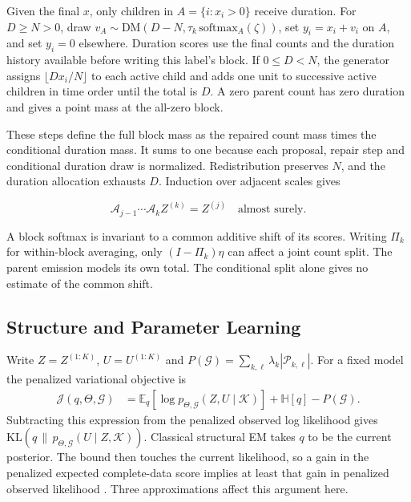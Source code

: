 \documentclass[sigconf]{acmart}
\begin{document}
Given the final \(x\), only children in \(A=\{i:x_i>0\}\) receive duration. For \(D\ge N>0\), draw \(v_A\sim\mathrm{DM}(D-N,\tau_k\,\mathrm{softmax}_A(\zeta))\), set \(y_i=x_i+v_i\) on \(A\), and set \(y_i=0\) elsewhere. Duration scores use the final counts and the duration history available before writing this label's block. If \(0\le D<N\), the generator assigns \(\lfloor D x_i/N\rfloor\) to each active child and adds one unit to successive active children in time order until the total is \(D\). A zero parent count has zero duration and gives a point mass at the all-zero block.

These steps define the full block mass as the repaired count mass times the conditional duration mass. It sums to one because each proposal, repair step and conditional duration draw is normalized. Redistribution preserves \(N\), and the duration allocation exhausts \(D\). Induction over adjacent scales gives

\begin{equation}
  \mathcal A_{j-1}\cdots\mathcal A_kZ^{(k)}=Z^{(j)}
  \quad\text{almost surely}.
  \label{eq:exact_coherence}
\end{equation}

A block softmax is invariant to a common additive shift of its scores. Writing \(\Pi_k\) for within-block averaging, only \((I-\Pi_k)\eta\) can affect a joint count split. The parent emission models its own total. The conditional split alone gives no estimate of the common shift.

\subsection{Structure and Parameter Learning}
\label{sec:structure_parameter_learning}

Write \(Z=Z^{(1:K)}\), \(U=U^{(1:K)}\) and \(P(\mathcal G)=\sum_{k,\ell}\lambda_k|\mathcal P_{k,\ell}|\). For a fixed model the penalized variational objective is
\begin{align}
 \mathcal J(q,\Theta,\mathcal G)
 &=\mathbb E_q[\log p_{\Theta,\mathcal G}(Z,U\mid\mathcal K)]
   +\mathbb H[q]-P(\mathcal G).
 \label{eq:penalized_elbo}
\end{align}
Subtracting this expression from the penalized observed log likelihood gives \(\mathrm{KL}(q\,\|\,p_{\Theta,\mathcal G}(U\mid Z,\mathcal K))\). Classical structural EM takes \(q\) to be the current posterior. The bound then touches the current likelihood, so a gain in the penalized expected complete-data score implies at least that gain in penalized observed likelihood \citep{friedman_structural_1998}. Three approximations affect this argument here.
\end{document}
